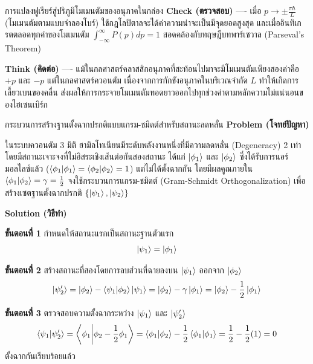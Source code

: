 \begin{psctbox}{การแปลงฟูเรียร์สู่ปริภูมิโมเมนตัมของอนุภาคในกล่อง}
\textbf{Check (ตรวจสอบ)} ---- เมื่อ $p \to \pm \frac{\pi\hbar}{L}$ (โมเมนตัมตามแบบจำลองโบร์) ใช้กฎโลปิตาลจะได้ค่าความน่าจะเป็นมีจุดยอดสูงสุด และเมื่ออินทิเกรตตลอดทุกค่าของโมเมนตัม $\int_{-\infty}^\infty P(p) dp = 1$ สอดคล้องกับทฤษฎีบทพาร์เซวาล (Parseval's Theorem)

\textbf{Think (คิดต่อ)} ---- แม้ในกลศาสตร์คลาสสิกอนุภาคที่สะท้อนไปมาจะมีโมเมนตัมเพียงสองค่าคือ $+p$ และ $-p$ แต่ในกลศาสตร์ควอนตัม เนื่องจากการกักขังอนุภาคในบริเวณจำกัด $L$ ทำให้เกิดการเลี้ยวเบนของคลื่น ส่งผลให้การกระจายโมเมนตัมทอดยาวออกไปทุกช่วงค่าตามหลักความไม่แน่นอนของไฮเซนเบิร์ก
\end{psctbox}

\begin{psctbox}{กระบวนการสร้างฐานตั้งฉากปรกติแบบแกรม-ชมิดต์สำหรับสถานะลดหลั่น}
\textbf{Problem (โจทย์ปัญหา)}

ในระบบควอนตัม 3 มิติ ฮามิลโทเนียนมีระดับพลังงานหนึ่งที่มีความลดหลั่น (Degeneracy) 2 เท่า โดยมีสถานะเจาะจงที่ไม่อิสระเชิงเส้นต่อกันสองสถานะ ได้แก่ $\ket{\phi_1}$ และ $\ket{\phi_2}$ ซึ่งได้รับการนอร์มอลไลซ์แล้ว ($\braket{\phi_1}{\phi_1} = \braket{\phi_2}{\phi_2} = 1$) แต่ไม่ได้ตั้งฉากกัน โดยมีผลคูณภายใน $\braket{\phi_1}{\phi_2} = \gamma = \frac{1}{2}$
จงใช้กระบวนการแกรม-ชมิดต์ (Gram-Schmidt Orthogonalization) เพื่อสร้างเซตฐานตั้งฉากปรกติ $\{\ket{\psi_1}, \ket{\psi_2}\}$

\textbf{Solution (วิธีทำ)}

\textbf{ขั้นตอนที่ 1} กำหนดให้สถานะแรกเป็นสถานะฐานตัวแรก
\begin{equation*}
\ket{\psi_1} = \ket{\phi_1}
\end{equation*}

\textbf{ขั้นตอนที่ 2} สร้างสถานะที่สองโดยการลบส่วนที่ฉายลงบน $\ket{\psi_1}$ ออกจาก $\ket{\phi_2}$
\begin{equation*}
\ket{\psi_2'} = \ket{\phi_2} - \braket{\psi_1}{\phi_2}\ket{\psi_1} = \ket{\phi_2} - \gamma \ket{\phi_1} = \ket{\phi_2} - \frac{1}{2}\ket{\phi_1}
\end{equation*}

\textbf{ขั้นตอนที่ 3} ตรวจสอบความตั้งฉากระหว่าง $\ket{\psi_1}$ และ $\ket{\psi_2'}$
\begin{equation*}
\braket{\psi_1}{\psi_2'} = \braket{\phi_1}{\phi_2 - \frac{1}{2}\phi_1} = \braket{\phi_1}{\phi_2} - \frac{1}{2}\braket{\phi_1}{\phi_1} = \frac{1}{2} - \frac{1}{2}(1) = 0
\end{equation*}
ตั้งฉากกันเรียบร้อยแล้ว


\end{psctbox}
